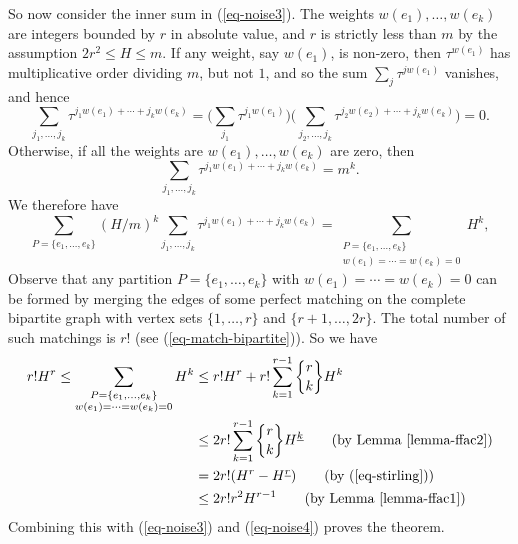 \documentclass[14pt]{extarticle}
\newcommand{\ssum}[2]{\sum_{\substack{#1 \\ #2}}}
\begin{document}
So now consider the inner sum in (\ref{eq-noise3}).
The weights $w(e_1), \ldots, w(e_k)$ are integers bounded
by $r$ in absolute value, and $r$ is strictly less than $m$
by the assumption $2 r^2 \le H \le m$.
If any weight, say $w(e_1)$, is non-zero, then $\tau^{w(e_1)}$
has multiplicative order dividing $m$, but not $1$, and so
the sum
$\sum_{j} \tau^{j w(e_1)}$ vanishes,
and hence
\[
\sum_{j_1, \ldots, j_k} \tau^{j_1 w(e_1) + \cdots + j_k w(e_k)} 
   = \biggl( \sum_{j_1} \tau^{j_1 w(e_1)} \biggr)  
     \biggl( \sum_{j_2, \ldots, j_k} \tau^{j_2 w(e_2) + \cdots + j_k w(e_k)} \biggr) = 0 .
\]
Otherwise, if all the weights are $w(e_1), \ldots, w(e_k)$ are zero,
then  
\[
\sum_{j_1, \ldots, j_k} \tau^{j_1 w(e_1) + \cdots + j_k w(e_k)} = m^k.
\]
We therefore have
\begin{equation}
\label{eq-noise4}
\sum_{P = \{e_1, \ldots, e_k\}} (H/m)^k 
   \sum_{j_1, \ldots, j_k} \tau^{j_1 w(e_1) + \cdots + j_k w(e_k)}
  = \ssum{P = \{e_1, \ldots, e_k\}}{w(e_1) = \cdots = w(e_k) = 0} H^k ,
\end{equation}
Observe that
any partition $P=\{e_1,\ldots,e_k\}$ with $w(e_1) = \cdots = w(e_k) = 0$
can be formed by merging
the edges of some perfect matching on the complete bipartite
graph with vertex sets $\{1, \ldots, r\}$ and $\{r+1, \ldots, 2r\}$.
The total number of such matchings is $r!$ (see (\ref{eq-match-bipartite})).
So we have
\begin{align*}
r! H^r \le \ssum{P = \{e_1, \ldots, e_k\}}{w(e_1) = \cdots = w(e_k) = 0} H^k & \le r! H^r + r! \sum_{k=1}^{r-1} {r \brace k} H^k \\ 
  & \le 2 r!  \sum_{k=1}^{r-1} {r \brace k} H^{\underline{k}} 
         \qquad \text{(by Lemma~\ref{lemma-ffac2})}\\
   & = 2 r! (H^r - H^{\underline{r}})
         \qquad \text{(by (\ref{eq-stirling}))} \\
   & \le 2 r! r^2 H^{r-1} 
         \qquad \text{(by Lemma~\ref{lemma-ffac1})} \\
\end{align*}
Combining this with (\ref{eq-noise3}) and (\ref{eq-noise4})
proves the theorem.
\end{document}
